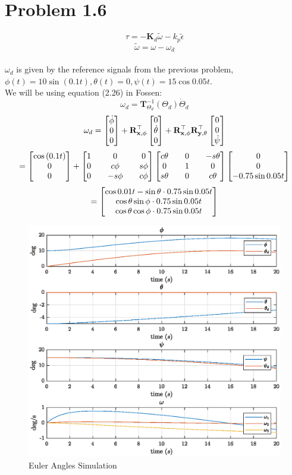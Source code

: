 \section*{Problem 1.6}

$$\tau = -\mathbf{K}_d \tilde \omega - k_p \tilde \epsilon $$
$$\tilde \omega = \omega - \omega_d $$
\\ $\omega_d $ is given by the reference signals from the previous problem, $\phi(t) = 10 \sin{(0.1t)}, \theta(t) = 0, \psi(t) = 15 \cos{0.05t}$.
\\ We will be using equation (2.26) in Fossen:
$$ \omega_d = \mathbf{T}_{\Theta_d}^{-1}(\Theta_d) \dot \Theta_d $$
$$ \omega_d = \begin{bmatrix}\dot \phi \\ 0 \\ 0\end{bmatrix} + \mathbf{R_{x, \phi}^\top} \begin{bmatrix}0 \\ \dot \theta \\ 0\end{bmatrix} + \mathbf{R_{x, \phi}^\top} \mathbf{R_{y, \theta}^\top} \begin{bmatrix}0 \\ 0 \\ \dot \psi\end{bmatrix} $$
$$ = \begin{bmatrix}\cos{(0.1t)} \\ 0 \\ 0\end{bmatrix} + \begin{bmatrix}1 && 0 && 0 \\ 0 && c\phi && s\phi \\ 0 && -s\phi && c\phi\end{bmatrix} \begin{bmatrix}c\theta && 0 && -s\theta \\ 0 && 1 && 0 \\ s\theta && 0 && c\theta\end{bmatrix} \begin{bmatrix}0 \\ 0 \\ -0.75 \sin{0.05t}\end{bmatrix}$$
$$ = \begin{bmatrix}\cos{0.01t} - \sin\theta \cdot 0.75 \sin{0.05t} \\ \cos \theta \sin\phi \cdot 0.75 \sin{0.05t} \\ \cos \theta \cos \phi  \cdot 0.75 \sin{0.05t} \end{bmatrix} $$



\begin{figure}
    \centering
    \includegraphics[scale=0.8]{eulang3.eps}
    \caption{Euler Angles Simulation}
    \label{fig:eulang3}
\end{figure}


